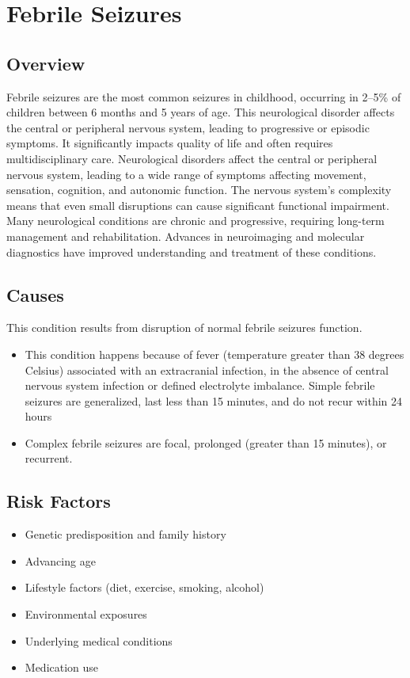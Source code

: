 \chapter{Febrile Seizures}
\label{sec:Febrile Seizures}

\section{Overview}
Febrile seizures are the most common seizures in childhood, occurring in 2--5\% of children between 6 months and 5 years of age. This neurological disorder affects the central or peripheral nervous system, leading to progressive or episodic symptoms. It significantly impacts quality of life and often requires multidisciplinary care. Neurological disorders affect the central or peripheral nervous system, leading to a wide range of symptoms affecting movement, sensation, cognition, and autonomic function. The nervous system's complexity means that even small disruptions can cause significant functional impairment. Many neurological conditions are chronic and progressive, requiring long-term management and rehabilitation. Advances in neuroimaging and molecular diagnostics have improved understanding and treatment of these conditions.
\section{Causes}
This condition results from disruption of normal febrile seizures function.

\begin{itemize}[noitemsep]
  \item This condition happens because of fever (temperature greater than 38 degrees Celsius) associated with an extracranial infection, in the absence of central nervous system infection or defined electrolyte imbalance. Simple febrile seizures are generalized, last less than 15 minutes, and do not recur within 24 hours
  \item Complex febrile seizures are focal, prolonged (greater than 15 minutes), or recurrent.
\end{itemize}
\section{Risk Factors}
\begin{itemize}[noitemsep]
  \item Genetic predisposition and family history
  \item Advancing age
  \item Lifestyle factors (diet, exercise, smoking, alcohol)
  \item Environmental exposures
  \item Underlying medical conditions
  \item Medication use
\end{itemize}
